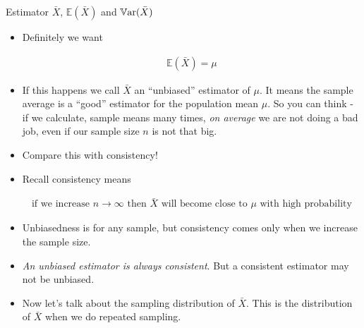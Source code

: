 \documentclass[8pt, usepdftitle=false]{beamer}
\begin{document}
\begin{frame}[allowframebreaks]{Estimator $\bar{X}$, $\mathbb{E}(\bar{X})$ and $\mathbb{V}\mathrm{ar}{(}\bar{X})$}
\begin{itemize}
\begin{itemize}
\item 2. \emph{bottom-left:} This is better than the last one (in fact this is the best one) here estimates are always very close to the truth and also the variability is very low. This is what is called \alert{low-bias \& low-variance} situation. This is ideally what we want.

\item 3. \emph{bottom-right:} In this case the variability is not high, but the estimates are more or less always very off from the target. This is called \alert{high-bias \& low-variance} situation. This is not good, even if we have low variance.

\item 4. \emph{top-right:} This is the worst case, here the estimates are always very off from the target and also the variability is very high. This is called \alert{high-bias \& high-variance} situation.
\end{itemize}


  \item Definitely we want 

    \begin{align*}
    \mathbb{E}(\bar{X}) = \mu
  \end{align*}

  \item If this happens we call $\bar{X}$ an ``unbiased'' estimator of $\mu$. It means the sample average is a ``good'' estimator for the population mean $\mu$. So you can think - if we calculate, sample means many times, \emph{on average} we are not doing a bad job, even if our sample size $n$ is not that big.



  \item Compare this with consistency!


  \item Recall consistency means 

  \begin{align*}
     \text{if we increase } n \to \infty \text{ then } \bar{X} \text{ will become close to } \mu \text{ with high probability}
  \end{align*}


  \item Unbiasedness is for any sample, but consistency comes only when we increase the sample size. 

  \item \emph{An unbiased estimator is always consistent}. But a \alert{consistent estimator may not be unbiased}.




  \item Now let's talk about the sampling distribution of $\bar{X}$. This is the distribution of $\bar{X}$ when we do repeated sampling. 



\end{itemize}
\end{frame}
\end{document}
